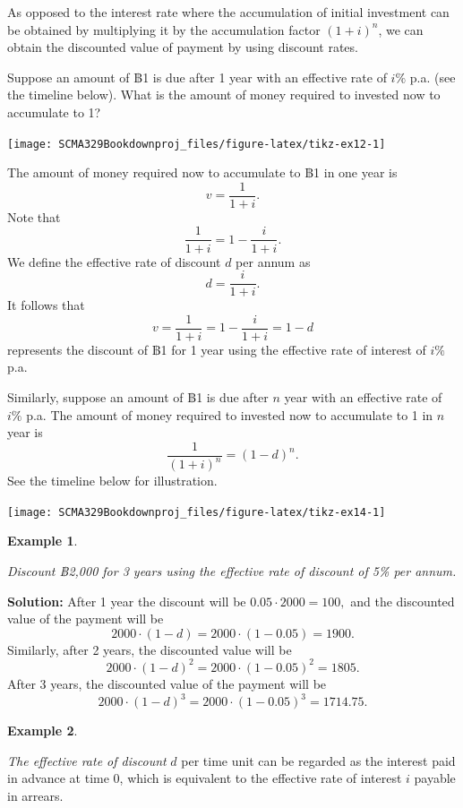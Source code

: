 \documentclass[
]{book}
\theoremstyle{definition}
\theoremstyle{definition}
\newtheorem{example}{Example}[chapter]
\theoremstyle{definition}
\theoremstyle{definition}
\theoremstyle{remark}
\begin{document}
As opposed to the interest rate where the accumulation of initial
investment can be obtained by multiplying it by the accumulation factor
\((1+i)^n\), we can obtain the discounted value of payment by using
discount rates.

Suppose an amount of ฿1 is due after 1 year with an effective rate of
\(i \%\) p.a. (see the timeline below). What is the amount of money
required to invested now to accumulate to 1?

\begin{center}\texttt{[image: SCMA329Bookdownproj\_files/figure-latex/tikz-ex12-1]} \end{center}

The amount of money required now to accumulate to ฿1 in one year is
\[v =  \frac{1}{1+i}.\] Note that \[\frac{1}{1+i} = 1 - \frac{i}{1+i}.\]
We define the effective rate of discount \(d\) per annum
as\[d = \frac{i}{1+i}.\] It follows that
\[v = \frac{1}{1+i} = 1 - \frac{i}{1+i} =  1 - d\] represents the
discount of ฿1 for 1 year using the effective rate of interest of \(i \%\)
p.a.

Similarly, suppose an amount of ฿1 is due after \(n\) year with an
effective rate of \(i \%\) p.a. The amount of money required to invested
now to accumulate to 1 in \(n\) year is \[\frac{1}{(1+i)^n} = (1-d)^n.\]
See the timeline below for illustration.

\begin{center}\texttt{[image: SCMA329Bookdownproj\_files/figure-latex/tikz-ex14-1]} \end{center}

\begin{example}
\protect\hypertarget{exm:unlabeled-div-28}{}\label{exm:unlabeled-div-28}

\emph{Discount ฿2,000 for 3 years using the effective rate of discount of 5\%
per annum.}

\end{example}

\textbf{Solution:} After 1 year the discount will be \(0.05 \cdot 2000 = 100,\)
and the discounted value of the payment will be
\[2000 \cdot (1 - d) = 2000 \cdot (1 - 0.05) = 1900 .\] Similarly, after
2 years, the discounted value will be
\[2000 \cdot (1 - d)^2 = 2000 \cdot (1 - 0.05)^2 = 1805 .\] After 3
years, the discounted value of the payment will be
\[2000 \cdot (1 - d)^3 = 2000 \cdot (1 - 0.05)^3 = 1714.75 .\]

\begin{example}
\protect\hypertarget{exm:unlabeled-div-29}{}\label{exm:unlabeled-div-29}

\emph{The effective rate of discount} \(d\) per time unit can be regarded as
the interest paid in advance at time 0, which is equivalent to the
effective rate of interest \(i\) payable in arrears.

\end{example}
\end{document}
